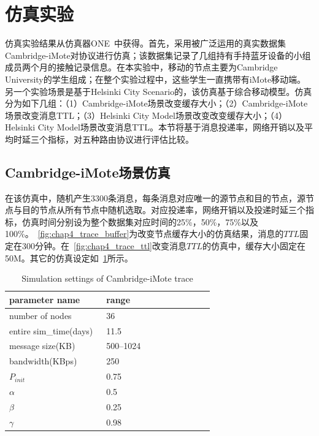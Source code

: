 \section{仿真实验}
\label{chap4:仿真实验}

仿真实验结果从仿真器ONE~\cite{Keranen2009}中获得。首先，采用被广泛运用的真实数据集Cambridge-iMote对协议进行仿真；该数据集记录了几组持有手持蓝牙设备的小组成员两个月的接触记录信息。在本实验中，移动的节点主要为Cambridge University的学生组成；在整个实验过程中，这些学生一直携带有iMote移动端。另一个实验场景是基于Helsinki City Scenario的，该仿真基于综合移动模型。仿真分为如下几组：（1）Cambridge-iMote场景改变缓存大小；（2）Cambridge-iMote场景改变消息TTL；（3）Helsinki City Model场景改变改变缓存大小；（4）Helsinki City Model场景改变消息TTL。本节将基于消息投递率，网络开销以及平均时延三个指标，对五种路由协议进行评估比较。

\subsection{Cambridge-iMote场景仿真}

在该仿真中，随机产生3300条消息，每条消息对应唯一的源节点和目的节点，源节点与目的节点从所有节点中随机选取。对应投递率，网络开销以及投递时延三个指标，仿真时间分别设为整个数据集对应时间的25\%，50\%，75\%以及100\%。\figurename~\ref{fig:chap4_trace_buffer}为改变节点缓存大小的仿真结果，消息的$TTL$固定在300分钟。在\figurename~\ref{fig:chap4_trace_ttl}改变消息$TTL$的仿真中，缓存大小固定在50M。其它的仿真设定如\tablename~\ref{tab:chap4_simulation}所示。


\begin{table}
\centering
\caption{Simulation settings of Cambridge-iMote trace}
\label{tab:chap4_simulation}
\begin{tabular}{
p{0.45\linewidth}<{\centering}
p{0.5\linewidth}<{\centering}
}
\hline
\textbf{parameter name} & \textbf{range} \\
\hline
number of nodes & 36  \\
entire sim\_time(days) & 11.5 \\
message size(KB) & 500--1024 \\
bandwidth(KBps) & 250 \\
$P_{init}$ & 0.75 \\
$\alpha$ & 0.5 \\
$\beta$ & 0.25 \\
$\gamma$ & 0.98 \\
\hline
\end{tabular}
\end{table}


